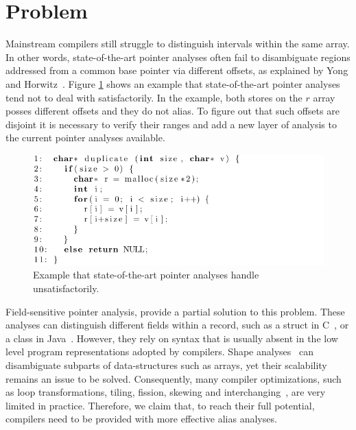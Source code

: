 \documentclass[12pt]{article}
\begin{document}
\section {Problem}
Mainstream compilers still struggle to distinguish intervals within the
same array.
In other words, state-of-the-art pointer analyses often fail to disambiguate
regions addressed from a common base pointer via different
offsets, as explained by Yong and Horwitz~\cite{Yong04}. Figure 
\ref{fig:intro_ex} shows an example that state-of-the-art pointer analyses 
tend not to deal with satisfactorily. In the example, both stores on the $r$ 
array posses different offsets and they do not alias. To figure out that such 
offsets are disjoint it is necessary to verify their ranges and add a new layer
of analysis to the current pointer analyses available.

\begin{figure}[t!]
  \centering
\includegraphics[width=\linewidth]{img/introex}
  \caption{Example that state-of-the-art pointer analyses handle 
  unsatisfactorily.}
  \label{fig:intro_ex}
\end{figure}

Field-sensitive pointer analysis, provide a partial solution to this problem.
These analyses can distinguish different fields within a record, such
as a struct in C~\cite{Pearce04}, or a class in Java~\cite{Yan11}.
However, they rely on syntax that is usually absent in the low level program
representations adopted by compilers.
Shape analyses~\cite{Jones82,Sagiv98} can disambiguate subparts of
data-structures such as arrays, yet their scalability remains an issue to be
solved.
Consequently, many compiler optimizations, such as
loop transformations, tiling, fission, skewing and
interchanging~\cite[Ch.09]{Wolfe96}, are very limited in practice.
Therefore, we claim that, to reach their full potential, compilers need to
be provided with more effective alias analyses.
\end{document}
